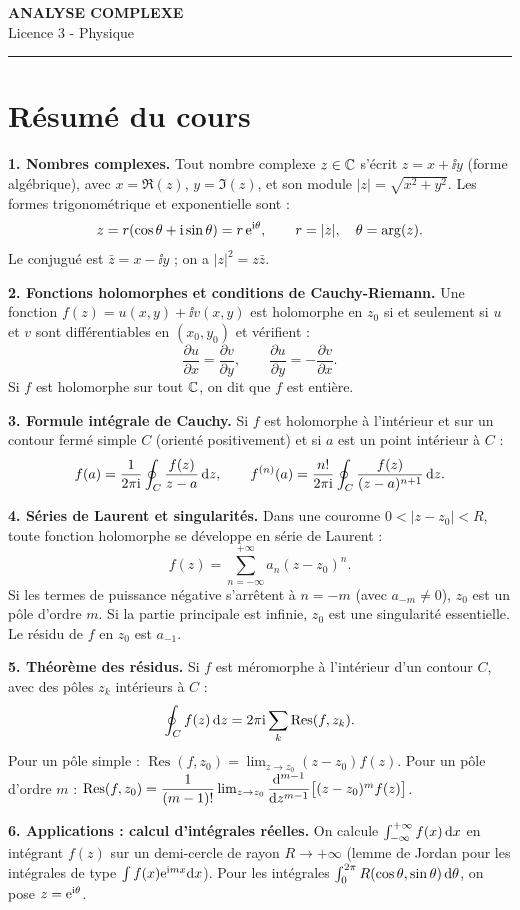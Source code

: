 \documentclass[12pt,a4paper]{article}
\begin{document}
\fi

\begin{center}
  {\LARGE\bfseries ANALYSE COMPLEXE}\\[0.3cm]
  {\normalsize Licence 3 - Physique}\\[0.1cm]
  \rule{0.7\textwidth}{0.8pt}
\end{center}

\section*{Résumé du cours}

\begin{boiteresume}

\textbf{1. Nombres complexes.}
Tout nombre complexe $z \in \mathbb{C}$ s'écrit $z = x + \ii y$ (forme algébrique), avec $x = \Re(z)$, $y = \Im(z)$, et son module $|z| = \sqrt{x^2+y^2}$. Les formes trigonométrique et exponentielle sont :
\[
z = r(\cos\theta + \mathrm{i}\sin\theta) = r\,\mathrm{e}^{\mathrm{i}\theta},
\qquad r = |z|,\quad \theta = \arg(z).
\]
Le conjugué est $\bar{z} = x - \ii y$ ; on a $|z|^2 = z\bar{z}$.

\textbf{2. Fonctions holomorphes et conditions de Cauchy-Riemann.}
Une fonction $f(z) = u(x,y) + \ii v(x,y)$ est holomorphe en $z_0$ si et seulement si $u$ et $v$ sont différentiables en $(x_0,y_0)$ et vérifient :
\[
\frac{\partial u}{\partial x} = \frac{\partial v}{\partial y}, \qquad
\frac{\partial u}{\partial y} = -\frac{\partial v}{\partial x}.
\]
Si $f$ est holomorphe sur tout $\mathbb{C}$, on dit que $f$ est entière.

\textbf{3. Formule intégrale de Cauchy.}
Si $f$ est holomorphe à l'intérieur et sur un contour fermé simple $C$ (orienté positivement) et si $a$ est un point intérieur à $C$ :
\[
f(a) = \frac{1}{2\pi\mathrm{i}} \oint_C \frac{f(z)}{z-a}\,\mathrm{d} z,
\qquad
f^{(n)}(a) = \frac{n!}{2\pi\mathrm{i}} \oint_C \frac{f(z)}{(z-a)^{n+1}}\,\mathrm{d} z.
\]

\textbf{4. Séries de Laurent et singularités.}
Dans une couronne $0 < |z - z_0| < R$, toute fonction holomorphe se développe en série de Laurent :
\[
f(z) = \sum_{n=-\infty}^{+\infty} a_n (z-z_0)^n.
\]
Si les termes de puissance négative s'arrêtent à $n = -m$ (avec $a_{-m} \neq 0$), $z_0$ est un pôle d'ordre $m$. Si la partie principale est infinie, $z_0$ est une singularité essentielle. Le résidu de $f$ en $z_0$ est $a_{-1}$.

\textbf{5. Théorème des résidus.}
Si $f$ est méromorphe à l'intérieur d'un contour $C$, avec des pôles $z_k$ intérieurs à $C$ :
\[
\oint_C f(z)\,\mathrm{d} z = 2\pi\mathrm{i} \sum_k \operatorname{Res}(f, z_k).
\]
Pour un pôle simple : $\operatorname{Res}(f,z_0) = \lim_{z\to z_0}(z-z_0)f(z)$.
Pour un pôle d'ordre $m$ : $\operatorname{Res}(f,z_0) = \dfrac{1}{(m-1)!}\lim_{z\to z_0}\dfrac{\mathrm{d}^{m-1}}{\mathrm{d} z^{m-1}}\bigl[(z-z_0)^m f(z)\bigr]$.

\textbf{6. Applications : calcul d'intégrales réelles.}
On calcule $\int_{-\infty}^{+\infty} f(x)\,\mathrm{d} x$ en intégrant $f(z)$ sur un demi-cercle de rayon $R \to +\infty$ (lemme de Jordan pour les intégrales de type $\int f(x)\mathrm{e}^{\mathrm{i} mx}\mathrm{d} x$). Pour les intégrales $\int_0^{2\pi} R(\cos\theta,\sin\theta)\,\mathrm{d}\theta$, on pose $z = \mathrm{e}^{\mathrm{i}\theta}$.

\end{boiteresume}
\end{document}
